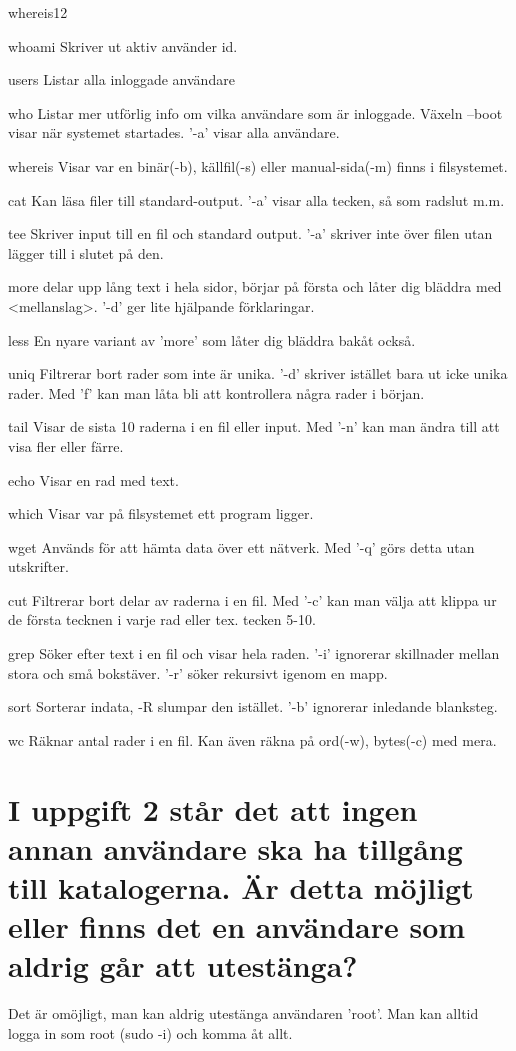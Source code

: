 \documentclass[11pt]{article}
\begin{document}
\begin{labeling}{whereis12}
\item [whoami] Skriver ut aktiv använder id. 	
\item [users] Listar alla inloggade användare	
\item [who] Listar mer utförlig info om vilka användare som är inloggade. Växeln --boot visar när systemet startades. '-a' visar alla användare. 
\item [whereis] Visar var en binär(-b), källfil(-s) eller manual-sida(-m) finns i filsystemet. 	
\item [cat] Kan läsa filer till standard-output. '-a' visar alla tecken, så som radslut m.m.
\item [tee] Skriver input till en fil och standard output. '-a' skriver inte över filen utan lägger till i slutet på den. 
\item [more] delar upp lång text i hela sidor, börjar på första och låter dig bläddra med <mellanslag>. '-d' ger lite hjälpande förklaringar. 	
\item [less] En nyare variant av 'more' som låter dig bläddra bakåt också.	
\item [uniq] Filtrerar bort rader som inte är unika. '-d' skriver istället bara ut icke unika rader. Med 'f' kan man låta bli att kontrollera några rader i början.  	
\item [tail] Visar de sista 10 raderna i en fil eller input. Med '-n' kan man ändra till att visa fler eller färre. 
\item [echo] Visar en rad med text. 	
\item [which] Visar var på filsystemet ett program ligger. 	
\item [wget] Används för att hämta data över ett nätverk.  Med '-q' görs detta utan utskrifter. 
\item [cut] Filtrerar bort delar av raderna i en fil. Med '-c' kan man välja att klippa ur de första tecknen i varje rad eller tex. tecken 5-10. 
\item [grep] Söker efter text i en fil och visar hela raden. '-i' ignorerar skillnader mellan stora och små bokstäver. '-r' söker rekursivt igenom en mapp. 
\item [sort] Sorterar indata, -R slumpar den istället. '-b' ignorerar inledande blanksteg.	
\item [wc] Räknar antal rader i en fil. Kan även räkna på ord(-w), bytes(-c) med mera.
\end{labeling}

\section{I uppgift 2 står det att ingen annan användare ska ha tillgång till katalogerna. Är detta möjligt eller finns det en användare som aldrig går att utestänga?}
Det är omöjligt, man kan aldrig utestänga användaren 'root'. Man kan alltid logga in som root (sudo -i) och komma åt allt. 
\end{document}
